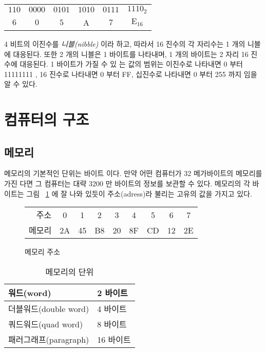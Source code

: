 \begin{tabular}{cccccc}
$110$ & $0000$ & $0101$ & $1010$ & $0111$ & $1110_2$ \\
  $6$ & $0$    &   $5$  &   A  &  $7$   &    $\mathrm{E}_{16}$ \\
\end{tabular}\newline

4 비트의 이진수를 \emph{니블(nibble)}  이라 하고, 따라서 16 진수의 각 자리수는 1 개의 니블에 대응된다.
또한 2 개의 니블은 1 바이트를 나타내며, 1 개의 바이트는 2 자리 16 진수에 대응된다. 1 바이트가 가질 수 있
는 값의 범위는 이진수로 나타내면 0 부터 11111111 , 16 진수로 나타내면 0 부터 FF, 십진수로 나타내면 0 부터 255 까지 임을
알 수 있다. 

\section{컴퓨터의 구조}

\subsection{메모리}
메모리의 기본적인 단위는 바이트 이다.   만약 어떤 컴퓨터가 32 메가바이트의 메모리를 가진
다면 그 컴퓨터는 대략 3200 만 바이트의 정보를 보관할 수 있다. 메모리의 각 바이트는 그림 ~\ref{fig:memory} 에
잘 나와 있듯이 주소(adress)라 불리는 고유의 값을 가지고 있다. 

\begin{figure}[ht]
\begin{center}
\begin{tabular}{rcccccccc}
주소 & 0 & 1 & 2 & 3 & 4 & 5 & 6 & 7 \\
\cline{2-9}
메모리 & \multicolumn{1}{|c}{2A}  & \multicolumn{1}{|c}{45}  
       & \multicolumn{1}{|c}{B8} & \multicolumn{1}{|c}{20} 
       & \multicolumn{1}{|c}{8F} & \multicolumn{1}{|c}{CD} 
       & \multicolumn{1}{|c}{12} & \multicolumn{1}{|c|}{2E} \\
\cline{2-9}
\end{tabular}
\caption{ 메모리 주소 \label{fig:memory} }
\end{center}
\end{figure}

\begin{table}
\begin{center}
\begin{tabular}{|l|l|}
\hline
워드(word) & 2 바이트 \\ \hline
더블워드(double word) & 4 바이트 \\ \hline
쿼드워드(quad word) & 8 바이트 \\ \hline
패러그래프(paragraph) & 16 바이트 \\ \hline
\end{tabular}
\caption{메모리의 단위 \label{tab:mem_units} }
\end{center}
\end{table}


